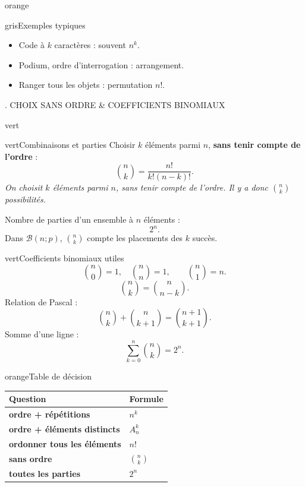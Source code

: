 \documentclass[11pt,a4paper]{article}
\newcommand{\Bin}{\mathcal B}
\newcommand{\tagcol}[2]{%
\begin{tcolorbox}[
    enhanced,
    colback=#1!11,
    colframe=#1!45!black,
    boxrule=0.42pt,
    arc=2mm,
    left=1mm,right=1mm,top=0.45mm,bottom=0.45mm,
    before skip=0mm,
    after skip=0.85mm,
    fontupper=\bfseries\scriptsize,
    colupper=#1!55!black
]
\centering #2
\end{tcolorbox}}
\begin{document}
\begin{landscape}
\begin{minipage}[t]{0.318\linewidth}
\begin{panel}{orange}
\begin{fichebox}{gris}{Exemples typiques}
\begin{itemize}
    \item Code à $k$ caractères : souvent $n^k$.
    \item Podium, ordre d'interrogation : arrangement.
    \item Ranger tous les objets : permutation $n!$.
\end{itemize}
\end{fichebox}

\end{panel}
\end{minipage}
\hfill
\begin{minipage}[t]{0.318\linewidth}
\tagcol{vert}{7. CHOIX SANS ORDRE \& COEFFICIENTS BINOMIAUX}
\begin{panel}{vert}

\begin{fichebox}{vert}{Combinaisons et parties}
Choisir $k$ éléments parmi $n$, \textbf{sans tenir compte de l'ordre} :
\[
\binom nk=\frac{n!}{k!(n-k)!}.
\]
\emph{On choisit $k$ éléments parmi $n$, sans tenir compte de l'ordre. Il y a donc $\binom nk$ possibilités.}

\medskip
Nombre de parties d'un ensemble à $n$ éléments :
\[
2^n.
\]
Dans $\Bin(n;p)$, $\binom nk$ compte les placements des $k$ succès.
\end{fichebox}

\begin{fichebox}{vert}{Coefficients binomiaux utiles}
\[
\binom n0=1,\quad \binom nn=1,
\qquad \binom n1=n.
\]
\[
\binom nk=\binom n{n-k}.
\]
Relation de Pascal :
\[
\binom nk+\binom n{k+1}=\binom {n+1}{k+1}.
\]
Somme d'une ligne :
\[
\sum_{k=0}^{n}\binom nk=2^n.
\]
\end{fichebox}

\begin{fichebox}{orange}{Table de décision}
\begin{tabularx}{\linewidth}{>{\bfseries}X>{\centering\arraybackslash}X}
Question & Formule \\
\hline
ordre + répétitions & $n^k$ \\
ordre + éléments distincts & $A_n^k$ \\
ordonner tous les éléments & $n!$ \\
sans ordre & $\binom nk$ \\
toutes les parties & $2^n$
\end{tabularx}
\end{fichebox}

\end{panel}
\end{minipage}
\end{landscape}
\clearpage
\restoregeometry
\pagecolor{white}\color{black}
\pagestyle{fancy}
\end{document}
